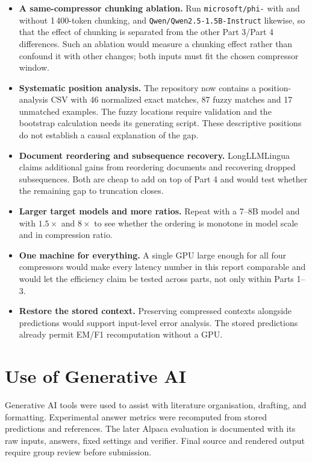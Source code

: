 ﻿\documentclass[10pt,a4paper,twocolumn]{article}
\newcommand{\PhiTwo}{\texttt{microsoft/\allowbreak phi-\allowbreak 2}}
\newcommand{\QwenOne}{\texttt{Qwen/}\allowbreak\texttt{Qwen2.5-\allowbreak 1.5B-\allowbreak Instruct}}
\begin{document}
\begin{itemize}
  \item \textbf{A same-compressor chunking ablation.} Run \PhiTwo{} with and
  without 1\,400-token chunking, and \QwenOne{} likewise, so
  that the effect of chunking is separated from the other Part 3/Part 4
  differences. Such an ablation would measure a chunking effect rather than confound it with other changes; both inputs must fit the chosen compressor window.
  \item \textbf{Systematic position analysis.} The repository now contains a position-analysis CSV with 46 normalized exact matches, 87 fuzzy matches and 17 unmatched examples. The fuzzy locations require validation and the bootstrap calculation needs its generating script. These descriptive positions do not establish a causal explanation of the gap.
  \item \textbf{Document reordering and subsequence recovery.} LongLLMLingua
  \citep{jiang-etal-2024-longllmlingua} claims additional gains from reordering
  documents and recovering dropped subsequences. Both are cheap to add on top of
  Part 4 and would test whether the remaining gap to truncation closes.
  \item \textbf{Larger target models and more ratios.} Repeat with a 7--8B model
  and with $1.5\times$ and $8\times$ to see whether the ordering is monotone in
  model scale and in compression ratio.
  \item \textbf{One machine for everything.} A single GPU large enough for all
  four compressors would make every latency number in this report comparable and
  would let the efficiency claim be tested across parts, not only within
  Parts 1--3.
  \item \textbf{Restore the stored context.} Preserving compressed contexts alongside predictions would support input-level error analysis. The stored predictions already permit EM/F1 recomputation without a GPU.
\end{itemize}

\section{Use of Generative AI}
\label{sec:ai}

Generative AI tools were used to assist with literature organisation, drafting,
and formatting. Experimental answer metrics were recomputed from stored predictions and references. The later Alpaca evaluation is documented with its raw inputs, answers, fixed settings and verifier. Final source and rendered output require group review before submission.
\end{document}
